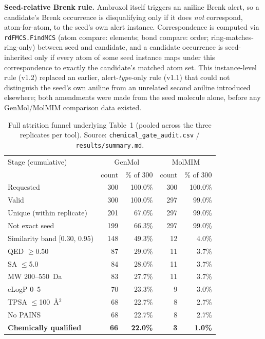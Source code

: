 \documentclass{article}
\begin{document}
\textbf{Seed-relative Brenk rule.} Ambroxol itself triggers an aniline Brenk alert, so a candidate's Brenk occurrence is disqualifying only if it does \emph{not} correspond, atom-for-atom, to the seed's own alert instance. Correspondence is computed via \texttt{rdFMCS.FindMCS} (atom compare: elements; bond compare: order; ring-matches-ring-only) between seed and candidate, and a candidate occurrence is seed-inherited only if every atom of some seed instance maps under this correspondence to exactly the candidate's matched atom set. This instance-level rule (v1.2) replaced an earlier, alert-\emph{type}-only rule (v1.1) that could not distinguish the seed's own aniline from an unrelated second aniline introduced elsewhere; both amendments were made from the seed molecule alone, before any GenMol/MolMIM comparison data existed.

\begin{table}[h]
\centering
\footnotesize
\begin{tabular}{lrrrr}
\toprule
Stage (cumulative) & \multicolumn{2}{c}{GenMol} & \multicolumn{2}{c}{MolMIM} \\
 & count & \% of 300 & count & \% of 300 \\
\midrule
Requested & 300 & 100.0\% & 300 & 100.0\% \\
Valid & 300 & 100.0\% & 297 & 99.0\% \\
Unique (within replicate) & 201 & 67.0\% & 297 & 99.0\% \\
Not exact seed & 199 & 66.3\% & 297 & 99.0\% \\
Similarity band [0.30, 0.95) & 148 & 49.3\% & 12 & 4.0\% \\
QED $\geq$0.50 & 87 & 29.0\% & 11 & 3.7\% \\
SA $\leq$5.0 & 84 & 28.0\% & 11 & 3.7\% \\
MW 200--550~Da & 83 & 27.7\% & 11 & 3.7\% \\
cLogP 0--5 & 70 & 23.3\% & 9 & 3.0\% \\
TPSA $\leq$100~\AA$^2$ & 68 & 22.7\% & 8 & 2.7\% \\
No PAINS & 68 & 22.7\% & 8 & 2.7\% \\
\textbf{Chemically qualified} & \textbf{66} & \textbf{22.0\%} & \textbf{3} & \textbf{1.0\%} \\
\bottomrule
\end{tabular}
\caption{Full attrition funnel underlying Table~1 (pooled across the three replicates per tool). Source: \texttt{chemical\_gate\_audit.csv} / \texttt{results/summary.md}.}
\label{tab:attrition-funnel}
\end{table}
\end{document}
